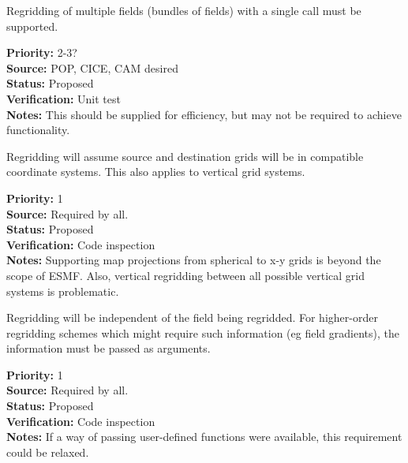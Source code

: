 
Regridding of multiple fields (bundles of fields) with
a single call must be supported.

\begin{reqlist}
{\bf Priority:} 2-3? \\
{\bf Source:} POP, CICE, CAM desired \\
{\bf Status:} Proposed \\
{\bf Verification:} Unit test \\
{\bf Notes:} This should be supplied for efficiency, but may not
             be required to achieve functionality.
\end{reqlist}


Regridding will assume source and destination grids will be
in compatible coordinate systems.  This also applies to vertical
grid systems.

\begin{reqlist}
{\bf Priority:} 1 \\
{\bf Source:} Required by all. \\
{\bf Status:} Proposed \\
{\bf Verification:} Code inspection  \\
{\bf Notes:} Supporting map projections from spherical to x-y grids is
             beyond the scope of ESMF.  Also, vertical regridding
             between all possible vertical grid systems is problematic.
\end{reqlist}


Regridding will be independent of the field being regridded.  For
higher-order regridding schemes which might require such information
(eg field gradients), the information must be passed as arguments.

\begin{reqlist}
{\bf Priority:} 1 \\
{\bf Source:} Required by all. \\
{\bf Status:} Proposed \\
{\bf Verification:} Code inspection  \\
{\bf Notes:} If a way of passing user-defined functions
             were available, this requirement could be relaxed.
\end{reqlist}

